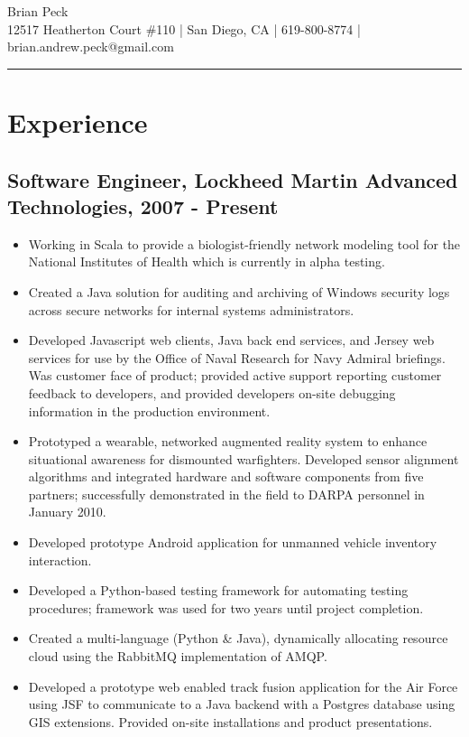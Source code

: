 \documentclass[11pt]{article}
\title{}
\date{}
\begin{document}
\begin{center}
{\huge Brian Peck} \\
12517 Heatherton Court \#110 | San Diego, CA | 619-800-8774 | brian.andrew.peck@gmail.com
\hrule
\end{center}

\section*{Experience}
\label{sec-1}

\subsection*{Software Engineer, Lockheed Martin Advanced Technologies, 2007 - Present}
\label{sec-1.1}

\begin{itemize}
\item Working in Scala to provide a biologist-friendly network modeling tool for the National Institutes of Health which is currently in alpha testing.
\item Created a Java solution for auditing and archiving of Windows security logs across secure networks for internal systems administrators.
\item Developed Javascript web clients, Java back end services, and Jersey web services for use by the Office of Naval Research for Navy Admiral briefings.  Was customer face of product; provided active support reporting customer feedback to developers, and provided developers on-site debugging information in the production environment.
\item Prototyped a wearable, networked augmented reality system to enhance situational awareness for dismounted warfighters.  Developed sensor alignment algorithms and integrated hardware and software components from five partners; successfully demonstrated in the field to DARPA personnel in January 2010.
\item Developed prototype Android application for unmanned vehicle inventory interaction.
\item Developed a Python-based testing framework for automating testing procedures; framework was used for two years until project completion.
\item Created a multi-language (Python \& Java), dynamically allocating resource cloud using the RabbitMQ implementation of AMQP.
\item Developed a prototype web enabled track fusion application for the Air Force using JSF to communicate to a Java backend with a Postgres database using GIS extensions. Provided on-site installations and product presentations.
\end{itemize}
\end{document}
